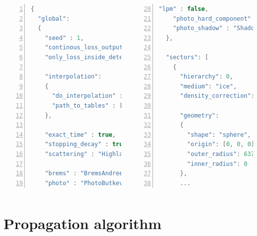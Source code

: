 \documentclass[aspectratio=1610, captions=tableheading, 11pt]{beamer}
\begin{document}
\begin{frame}[fragile]
  \vspace{-5mm}
  \begin{minipage}[t][\textheight][t]{\textwidth}
      \begin{columns}
      \begin{lstlisting}[language=C++,basicstyle=\footnotesize\ttfamily,keywordstyle=\color{red}, escapechar=\!, numbers=left, numberstyle=\tiny\ttfamily, numbersep=5pt]
{
  "global":
  {
    "seed" : 1,
    "continous_loss_output" : false,
    "only_loss_inside_detector" : false,

    "interpolation":
    {
      "do_interpolation" : true,
      "path_to_tables" : ["resources/tables"],
    },

    "exact_time" : true,
    "stopping_decay" : true,
    "scattering" : "Highland",

    "brems" : "BremsAndreevBezrukovBugaev",
    "photo" : "PhotoButkevichMikhailov",

\end{lstlisting}
     \begin{lstlisting}[language=C++,basicstyle=\footnotesize\ttfamily,keywordstyle=\color{red}, escapechar=\!, numbers=left, numberstyle=\tiny\ttfamily, numbersep=5pt, firstnumber=20]
    "lpm" : false,
    "photo_hard_component" : true,
    "photo_shadow" : "ShadowButkevichMikhailov",
  },

  "sectors": [
    {
      "hierarchy": 0,
      "medium": "ice",
      "density_correction": 1,

      "geometry":
      {
        "shape": "sphere",
        "origin": [0, 0, 0],
        "outer_radius": 6374134000000,
        "inner_radius": 0
      },
      ...
\end{lstlisting}
  \end{columns}
  \end{minipage}
\end{frame}

\section{Propagation algorithm}
\end{document}
